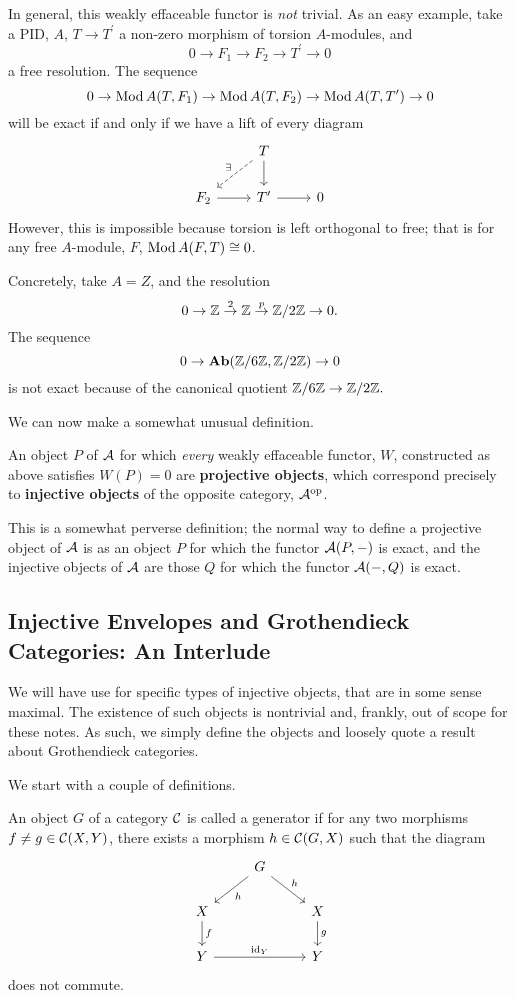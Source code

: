 \documentclass[reqno, 12pt]{amsart}
\begin{document}
\begin{remark}
  In general, this weakly effaceable functor is \emph{not} trivial.
  As an easy example, take a PID, $A$, $T \to T^\prime$ a non-zero morphism of torsion $A$-modules, and
  $$0 \to F_1 \to F_2 \to T^\prime \to 0$$
  a free resolution.
  The sequence
  $$0 \to \operatorname{Mod}A(T,F_1) \to \operatorname{Mod}A(T,F_2) \to \operatorname{Mod}A(T,T^\prime) \to 0$$
  will be exact if and only if we have a lift of every diagram
  $$\begin{tikzcd}
    & T\arrow{d}\arrow[dashed,swap]{ld}{\exists}\\
    F_2 \arrow{r} & T^\prime \arrow{r} & 0
  \end{tikzcd}$$
  However, this is impossible because torsion is left orthogonal to free; that is for any free $A$-module, $F$, $\operatorname{Mod}A(F, T) \cong 0$.

  Concretely, take $A = Z$, and the resolution
  $$0 \to \mathbb{Z} \overset{2}\to \mathbb{Z} \overset{p}\to \mathbb{Z}/2\mathbb{Z} \to 0.$$
  The sequence
  $$0\to \operatorname{\bf Ab}(\mathbb{Z}/6\mathbb{Z},\mathbb{Z}/2\mathbb{Z}) \to 0$$
  is not exact because of the canonical quotient $\mathbb{Z}/6\mathbb{Z} \to \mathbb{Z}/2\mathbb{Z}.$
\end{remark}

We can now make a somewhat unusual definition.
\begin{definition}
  An object $P$ of $\mathcal{A}$ for which \emph{every} weakly effaceable functor, $W$, constructed as above satisfies $W(P) = 0$ are \textbf{projective objects}, which correspond precisely to \textbf{injective objects} of the opposite category, $\mathcal{A}^{\operatorname{op}}$.
\end{definition}

This is a somewhat perverse definition; the normal way to define a projective object of $\mathcal{A}$ is as an object $P$ for which the functor $\mathcal{A}(P, -)$ is exact, and the injective objects of $\mathcal{A}$ are those $Q$ for which the functor $\mathcal{A}(-, Q)$ is exact.

\subsection{Injective Envelopes and Grothendieck Categories: An Interlude}
We will have use for specific types of injective objects, that are in some sense maximal.
The existence of such objects is nontrivial and, frankly, out of scope for these notes.  As such, we simply define the objects and loosely quote a result about Grothendieck categories.

We start with a couple of definitions.

\begin{definition}
  An object $G$ of a category $\mathcal{C}$ is called a generator if for any two morphisms $f \neq g \in \mathcal{C}(X,Y)$, there exists a morphism $h \in \mathcal{C}(G,X)$ such that the diagram
  $$\begin{tikzcd}
    & G \arrow{rd}{h}\arrow{ld}{h}\\
    X \arrow{d}{f} & & X\arrow{d}{g}\\
    Y \arrow{rr}{\id_Y} && Y
  \end{tikzcd}$$
  does not commute.
\end{definition}
\end{document}
